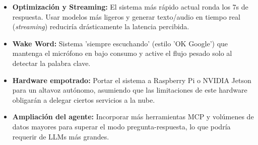 \documentclass[11pt,spanish,listoffigures,listoftables]{tfgetsinf}
\begin{document}
\begin{itemize}
    \item \textbf{Optimización y Streaming:} El sistema más rápido actual ronda los 7s de respuesta. Usar modelos más ligeros y generar texto/audio en tiempo real (\textit{streaming}) reduciría drásticamente la latencia percibida.
    \item \textbf{Wake Word:} Sistema 'siempre escuchando' (estilo 'OK Google') que mantenga el micrófono en bajo consumo y active el flujo pesado solo al detectar la palabra clave.
    \item \textbf{Hardware empotrado:} Portar el sistema a Raspberry Pi o NVIDIA Jetson para un altavoz autónomo, asumiendo que las limitaciones de este hardware obligarán a delegar ciertos servicios a la nube.
    \item \textbf{Ampliación del agente:} Incorporar más herramientas MCP y volúmenes de datos mayores para superar el modo pregunta-respuesta, lo que podría requerir de LLMs más grandes.
\end{itemize}

\cleardoublepage
\printbibliography


\APPENDIX




\end{document}
